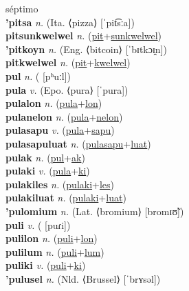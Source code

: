 séptimo \label{pitak} \\
\textbf{'pitsa} \textit{n.} (Ita. ⟨pizza⟩ [ˈpit͡sːa])
 \label{'pitsa} \\
\textbf{pitsunkwelwel} \textit{n.} (\hyperref[pit]{pit}+\hyperref[sunkwelwel]{sunkwelwel})
 \label{pitsunkwelwel} \\
\textbf{'pitkoyn} \textit{n.} (Eng. ⟨bitcoin⟩ [ˈbɪtkɔɪ̯n])
 \label{'pitkoyn} \\
\textbf{pitkwelwel} \textit{n.} (\hyperref[pit]{pit}+\hyperref[kwelwel]{kwelwel})
 \label{pitkwelwel} \\
\textbf{pul} \textit{n.} ( [pʰuːl])
 \label{pul} \\
\textbf{pula} \textit{v.} (Epo. ⟨pura⟩ [ˈpura])
 \label{pula} \\
\textbf{pulalon} \textit{n.} (\hyperref[pula]{pula}+\hyperref[lon]{lon})
 \label{pulalon} \\
\textbf{pulanelon} \textit{n.} (\hyperref[pula]{pula}+\hyperref[nelon]{nelon})
 \label{pulanelon} \\
\textbf{pulasapu} \textit{v.} (\hyperref[pula]{pula}+\hyperref[sapu]{sapu})
 \label{pulasapu} \\
\textbf{pulasapuluat} \textit{n.} (\hyperref[pulasapu]{pulasapu}+\hyperref[luat]{luat})
 \label{pulasapuluat} \\
\textbf{pulak} \textit{n.} (\hyperref[pul]{pul}+\hyperref[ak]{ak})
 \label{pulak} \\
\textbf{pulaki} \textit{v.} (\hyperref[pula]{pula}+\hyperref[ki]{ki})
 \label{pulaki} \\
\textbf{pulakiles} \textit{n.} (\hyperref[pulaki]{pulaki}+\hyperref[les]{les})
 \label{pulakiles} \\
\textbf{pulakiluat} \textit{n.} (\hyperref[pulaki]{pulaki}+\hyperref[luat]{luat})
 \label{pulakiluat} \\
\textbf{'pulomium} \textit{n.} (Lat. ⟨bromium⟩ [bromɪʊ̃])
 \label{'pulomium} \\
\textbf{puli} \textit{v.} ( [puɾi])
 \label{puli} \\
\textbf{pulilon} \textit{n.} (\hyperref[puli]{puli}+\hyperref[lon]{lon})
 \label{pulilon} \\
\textbf{pulilum} \textit{n.} (\hyperref[puli]{puli}+\hyperref[lum]{lum})
 \label{pulilum} \\
\textbf{puliki} \textit{v.} (\hyperref[puli]{puli}+\hyperref[ki]{ki})
 \label{puliki} \\
\textbf{'pulusel} \textit{n.} (Nld. ⟨Brussel⟩ [ˈbrʏsəl])
 \label{'pulusel} \\
